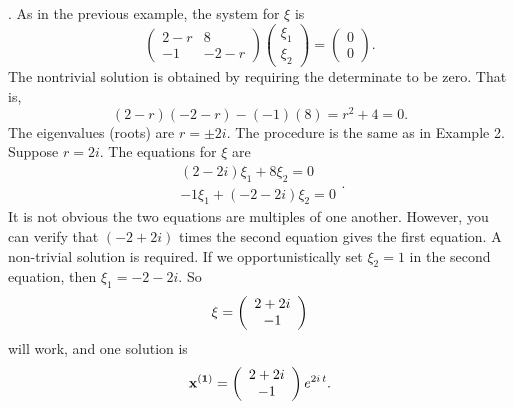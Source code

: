 \documentclass[leqno,DIV=calc,paper=a4,fontsize=11pt]{article}
\theoremstyle{definition}
\theoremstyle{plain}
\theoremstyle{remark}
\begin{document}
\vspace{.2in}
. As in the previous example, the system for
$\xi$ is
\[
\left(
\begin{array}{cc}2-r&8\\-1&-2-r\end{array}
\right)\left(\begin{array}{c}\xi_1\\ \xi_2\end{array}\right)=
\left(\begin{array}{c}0\\0\end{array}\right).
\]
The nontrivial solution is obtained by requiring the determinate to
be zero. That is,
\[
(2-r)(-2-r)-(-1)(8)= r^2+4=0.
\]
The eigenvalues (roots) are $r=\pm 2i$. The procedure is the same as
in Example 2. Suppose $r=2i$. The equations for $\xi$ are
\[
\begin{array}{c}(2-2i)\xi_1+8\xi_2=0\\-1\xi_1+(-2-2i)\xi_2=0\end{array}.
\]
It is not obvious the two equations are multiples of one another.
However, you can verify that $(-2+2i)$ times the second equation gives
the first equation. A non-trivial solution is required. If we
opportunistically set $\xi_2=1$ in the second equation, then $\xi_1=
-2-2i$. So
\[
{\bf \xi} = \left(\begin{array}{c}2+2i\\-1\end{array}\right)
\]
will work, and one solution is
\[
{\bf x^{(1)}} = \left(\begin{array}{c}2+2i\\-1\end{array}\right)e^{2i\,t}.
\]
\end{document}
